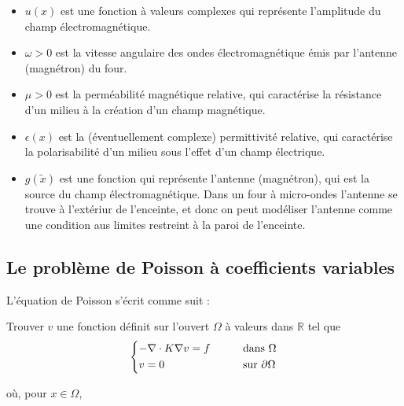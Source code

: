\begin{itemize}

    \item $u(x)$ est une fonction à valeurs complexes qui représente l'amplitude
    du champ électromagnétique.

    \item $\omega > 0$ est la vitesse angulaire des ondes électromagnétique émis
    par l'antenne (magnétron) du four.

    \item $\mu > 0$ est la perméabilité magnétique relative, qui
    caractérise la résistance d'un milieu à la création d'un champ magnétique.

    \item $\epsilon(x)$ est la (éventuellement complexe) permittivité relative,
    qui caractérise la polarisabilité d'un milieu sous l'effet d'un champ électrique.

    \item $g(\tilde{x})$ est une fonction qui représente l'antenne (magnétron), qui est
    la source du champ électromagnétique. Dans un four à micro-ondes l'antenne
    se trouve à l'extériur de l'enceinte, et donc on peut modéliser l'antenne
    comme une condition aus limites restreint à la paroi de l'enceinte.


\end{itemize}


\subsection{Le problème de Poisson à coefficients variables}

L'équation de Poisson s'écrit comme suit :

Trouver $v$ une fonction définit sur l'ouvert $\Omega$ à valeurs dans $\mathbb{R}$
tel que
\[\begin{dcases}
      -\nabla \cdot K \nabla v = f \qquad & \text{dans } \Omega \\
      v = 0 & \text{sur } \partial \Omega
\end{dcases}\]

où, pour $x \in \Omega$,

